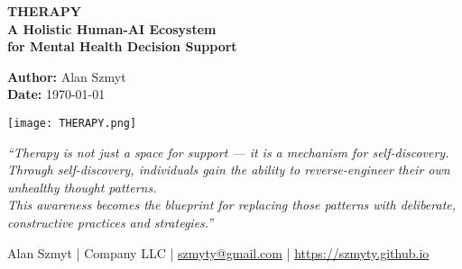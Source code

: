 \begin{titlepage}
\thispagestyle{empty}
\centering

\begin{framed}
\centering

\vspace{0.5cm}

{\LARGE\bfseries THERAPY}\\[0.6em]
{\large\bfseries A Holistic Human-AI Ecosystem}\\[0.25em]
{\large\bfseries for Mental Health Decision Support}

\vspace{1.2cm}

{\normalsize
\textbf{Author:} Alan Szmyt \\
\textbf{Date:} \today
}

\vspace{1.5cm}

\texttt{[image: THERAPY.png]}

\vspace{1.5cm}

\begin{minipage}{0.9\textwidth}
\centering
\itshape
“Therapy is not just a space for support — it is a mechanism for self-discovery.\\
Through self-discovery, individuals gain the ability to reverse-engineer their own unhealthy thought patterns.\\
This awareness becomes the blueprint for replacing those patterns with deliberate, constructive practices and strategies.”
\end{minipage}

\vspace{1cm}
\end{framed}

\vspace{0.5cm}

\begin{center}
\footnotesize
Alan Szmyt \quad | \quad Company LLC \quad | \quad \href{mailto:szmyty@gmail.com}{szmyty@gmail.com} \quad | \quad \url{https://szmyty.github.io}
\end{center}

\end{titlepage}
